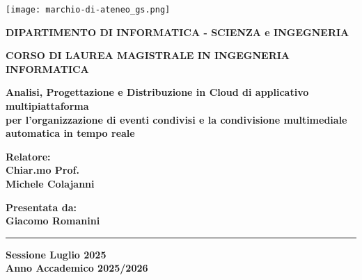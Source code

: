 
\begin{titlepage}
    
\pagestyle{empty}


\begin{center}

\texttt{[image: marchio-di-ateneo\_gs.png]}

\vspace{10mm}

{\normalsize{\bf{DIPARTIMENTO DI INFORMATICA - SCIENZA e INGEGNERIA}}} 

\vspace{5mm}

{\large{\bf{CORSO DI LAUREA MAGISTRALE IN INGEGNERIA INFORMATICA}}}
\end{center}
\vspace{23mm}
\begin{adjustwidth}{15mm}{15mm}
\begin{center}

{\LARGE{\bf Analisi, Progettazione e Distribuzione in Cloud di applicativo multipiattaforma}}\\

{\LARGE{\bf per l'organizzazione di eventi condivisi e la condivisione multimediale automatica in tempo reale}}\\
\vspace{3mm}
\vspace{3mm}

\end{center}
\end{adjustwidth}

\vspace{35mm}

\begin{minipage}[t]{0.40\textwidth}
{\Large{\bf Relatore: \\ Chiar.mo Prof.\\ Michele Colajanni}}

\vspace{3mm}

{\Large{\bf }}
\end{minipage}
\hfill
\begin{minipage}[t]{0.40\textwidth}\raggedleft
{\Large{\bf Presentata da: \\ Giacomo Romanini}}
\end{minipage}

\vspace{10mm}

\rule[0.5cm]{15.8cm}{0.6mm}

\begin{center}
{\large{\bf Sessione Luglio 2025 \\}}
{\large{\bf Anno Accademico 2025/2026\\}}
\end{center}

\end{titlepage}

\restoregeometry
